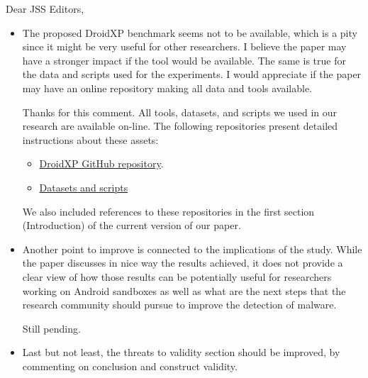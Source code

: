 \documentclass[12pt,english]{scrartcl}
\begin{document}
\begin{letter}{Dear JSS Editors,}
\begin{itemize}
\vspace{0.2cm}

\item The proposed DroidXP benchmark seems not to be available, which is a pity since it might be very useful for other 
researchers. I believe the paper may have a stronger impact if the tool would be available. The same is true for the 
data and scripts used for the experiments. I would appreciate if the paper may have an online repository making all 
data and tools available.


\vspace{0.2cm}

{\color{blue}{\bf Answer.} Thanks for this comment. All tools, datasets, and scripts we used in our research are available on-line. The following repositories present detailed instructions about these assets: 

  \begin{itemize}
    \item \href{https://github.com/droidxp/benchmark}{DroidXP GitHub repository}.
    \item \href{https://htmlpreview.github.io/?https://github.com/droidxp/paper-replication-package/blob/master/replication.html}{Datasets and scripts}
  \end{itemize}
  
  \vspace{0.2cm}
  
  We also included references to these repositories in the first section (Introduction) of the current version of
  our paper.}

\vspace{0.2cm}

\item Another point to improve is connected to the implications of the study. While the paper discusses in nice way the 
results achieved, it does not provide a clear view of how those results can be potentially useful for researchers 
working on Android sandboxes as well as what are the next steps that the research community should pursue to 
improve the detection of malware.


\vspace{0.2cm}

{\color{blue}{\bf Answer.} Still pending.}


\vspace{0.2cm}

\item Last but not least, the threats to validity section should be improved, by commenting on conclusion and construct validity.



\end{itemize}
\end{letter}
\end{document}
